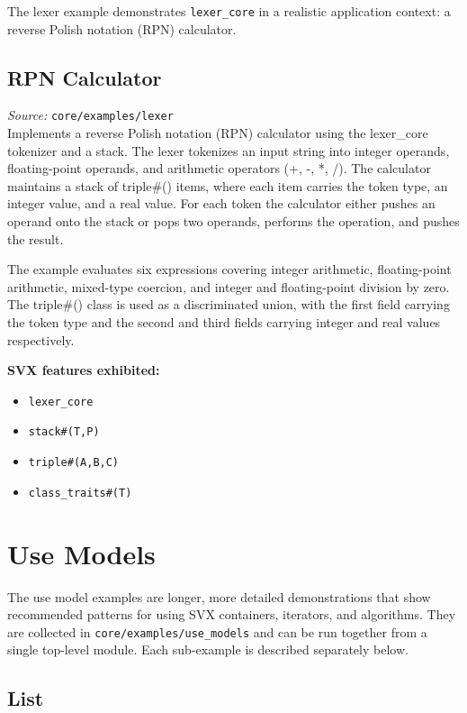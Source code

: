 \documentclass[11pt,letterpaper]{report}
\begin{document}
The lexer example demonstrates \texttt{lexer\_core} in a realistic application context: a reverse Polish notation (RPN) calculator.

\section{RPN Calculator}

\textit{Source:} \texttt{core/examples/lexer}\\

Implements a reverse Polish notation (RPN) calculator using the lexer\_core tokenizer and a stack. The lexer tokenizes an input string into integer operands, floating-point operands, and arithmetic operators (+, -, *, /). The calculator maintains a stack of triple\#() items, where each item carries the token type, an integer value, and a real value. For each token the calculator either pushes an operand onto the stack or pops two operands, performs the operation, and pushes the result.

The example evaluates six expressions covering integer arithmetic, floating-point arithmetic, mixed-type coercion, and integer and floating-point division by zero. The triple\#() class is used as a discriminated union, with the first field carrying the token type and the second and third fields carrying integer and real values respectively.

\textbf{SVX features exhibited:}

\begin{itemize}
  \item \texttt{lexer\_core}
  \item \texttt{stack\#(T,P)}
  \item \texttt{triple\#(A,B,C)}
  \item \texttt{class\_traits\#(T)}
\end{itemize}
\chapter{Use Models}

The use model examples are longer, more detailed demonstrations that show recommended patterns for using SVX containers, iterators, and algorithms. They are collected in \texttt{core/examples/use\_models} and can be run together from a single top-level module. Each sub-example is described separately below.

\section{List}
\end{document}
